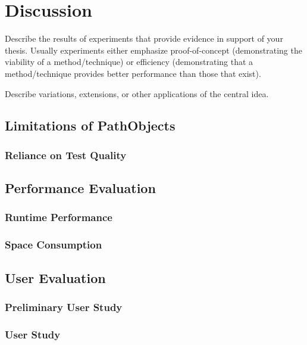 \chapter{Discussion}
\label{c:discussion}

Describe the results of experiments that provide evidence in support of your thesis. Usually experiments either emphasize proof-of-concept (demonstrating the viability of a method/technique) or efficiency (demonstrating that a method/technique provides better performance than those that exist).

Describe variations, extensions, or other applications of the central idea.

\section{Limitations of PathObjects}

\subsection{Reliance on Test Quality}

\section{Performance Evaluation}

\subsection{Runtime Performance}

\subsection{Space Consumption}

\section{User Evaluation}

\subsection{Preliminary User Study}

\subsection{User Study}
